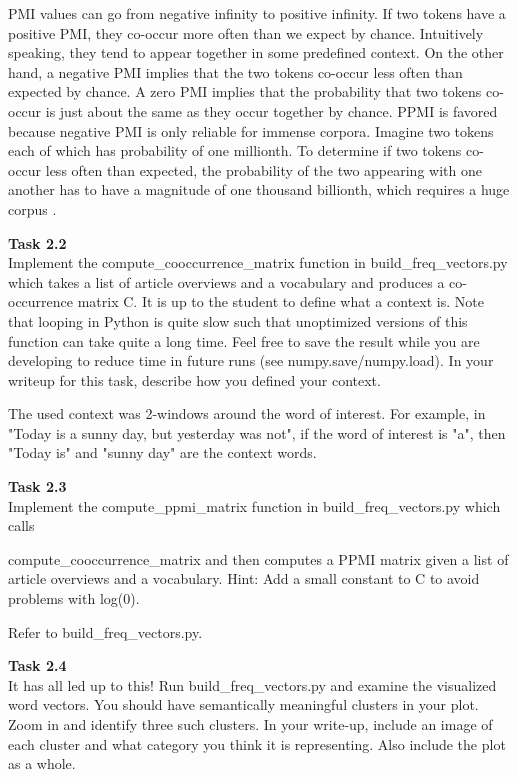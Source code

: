 \documentclass[12pt,article]{article}
\newenvironment{task}[2][Task]
    { \begin{mdframed}[backgroundcolor=gray!20] \textbf{#1 #2} \\}
    {  \end{mdframed}}
\begin{document}
PMI values can go from negative infinity to positive infinity. If two tokens have a positive PMI, they co-occur more often than we expect by chance. Intuitively speaking, they tend to appear together in some predefined context. On the other hand, a negative PMI implies that the two tokens co-occur less often than expected by chance. A zero PMI implies that the probability that two tokens co-occur is just about the same as they occur together by chance. PPMI is favored because negative PMI is only reliable for immense corpora. Imagine two tokens each of which has probability of one millionth. To determine if two tokens co-occur less often than expected, the probability of the two appearing with one another has to have a magnitude of one thousand billionth, which requires a huge corpus \cite{JurafskyMartin08}.

\begin{task}{2.2}
Implement the compute\_cooccurrence\_matrix function in build\_freq\_vectors.py which takes a list of article overviews and a vocabulary and produces a co-occurrence matrix C. It is up to the student to define what a context is. Note that looping in Python is quite slow such that unoptimized versions of this function can take quite a long time. Feel free to save the result while you are developing to reduce time in future runs (see numpy.save/numpy.load). In your writeup for this task, describe how you defined your context.
\end{task}

The used context was 2-windows around the word of interest. For example, in "Today is a sunny day, but yesterday was not", if the word of interest is "a", then "Today is" and "sunny day" are the context words.

\begin{task}{2.3} 
Implement the compute\_ppmi\_matrix function in build\_freq\_vectors.py which calls 

compute\_cooccurrence\_matrix and then computes a PPMI matrix given a list of article overviews and a vocabulary. Hint: Add a small constant to C to avoid problems with log(0).
\end{task}

Refer to build\_freq\_vectors.py.
\newpage
\begin{task}{2.4} 
It has all led up to this! Run build\_freq\_vectors.py and examine the visualized word vectors. You should have semantically meaningful clusters in your plot. Zoom in and identify three such clusters. In your write-up, include an image of each cluster and what category you think it is representing. Also include the plot as a whole.
\end{task}
\end{document}
